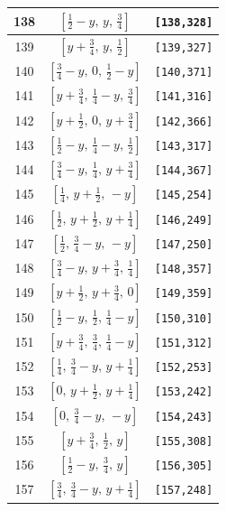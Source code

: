 \documentclass[fleqn,8pt]{jsarticle}
\begin{document}
\begin{longtable}{ccc}
138 & $\left[ \frac{1}{2} - y,\, y,\, \frac{3}{4} \right]$ & {\tt [138,328]} \\ \hline
139 & $\left[ y + \frac{3}{4},\, y,\, \frac{1}{2} \right]$ & {\tt [139,327]} \\ \hline
140 & $\left[ \frac{3}{4} - y,\, 0,\, \frac{1}{2} - y \right]$ & {\tt [140,371]} \\ \hline
141 & $\left[ y + \frac{3}{4},\, \frac{1}{4} - y,\, \frac{3}{4} \right]$ & {\tt [141,316]} \\ \hline
142 & $\left[ y + \frac{1}{2},\, 0,\, y + \frac{3}{4} \right]$ & {\tt [142,366]} \\ \hline
143 & $\left[ \frac{1}{2} - y,\, \frac{1}{4} - y,\, \frac{1}{2} \right]$ & {\tt [143,317]} \\ \hline
144 & $\left[ \frac{3}{4} - y,\, \frac{1}{4},\, y + \frac{3}{4} \right]$ & {\tt [144,367]} \\ \hline
145 & $\left[ \frac{1}{4},\, y + \frac{1}{2},\, - y \right]$ & {\tt [145,254]} \\ \hline
146 & $\left[ \frac{1}{2},\, y + \frac{1}{2},\, y + \frac{1}{4} \right]$ & {\tt [146,249]} \\ \hline
147 & $\left[ \frac{1}{2},\, \frac{3}{4} - y,\, - y \right]$ & {\tt [147,250]} \\ \hline
148 & $\left[ \frac{3}{4} - y,\, y + \frac{3}{4},\, \frac{1}{4} \right]$ & {\tt [148,357]} \\ \hline
149 & $\left[ y + \frac{1}{2},\, y + \frac{3}{4},\, 0 \right]$ & {\tt [149,359]} \\ \hline
150 & $\left[ \frac{1}{2} - y,\, \frac{1}{2},\, \frac{1}{4} - y \right]$ & {\tt [150,310]} \\ \hline
151 & $\left[ y + \frac{3}{4},\, \frac{3}{4},\, \frac{1}{4} - y \right]$ & {\tt [151,312]} \\ \hline
152 & $\left[ \frac{1}{4},\, \frac{3}{4} - y,\, y + \frac{1}{4} \right]$ & {\tt [152,253]} \\ \hline
153 & $\left[ 0,\, y + \frac{1}{2},\, y + \frac{1}{4} \right]$ & {\tt [153,242]} \\ \hline
154 & $\left[ 0,\, \frac{3}{4} - y,\, - y \right]$ & {\tt [154,243]} \\ \hline
155 & $\left[ y + \frac{3}{4},\, \frac{1}{2},\, y \right]$ & {\tt [155,308]} \\ \hline
156 & $\left[ \frac{1}{2} - y,\, \frac{3}{4},\, y \right]$ & {\tt [156,305]} \\ \hline
157 & $\left[ \frac{3}{4},\, \frac{3}{4} - y,\, y + \frac{1}{4} \right]$ & {\tt [157,248]} \\ \hline

\end{longtable}
\end{document}
